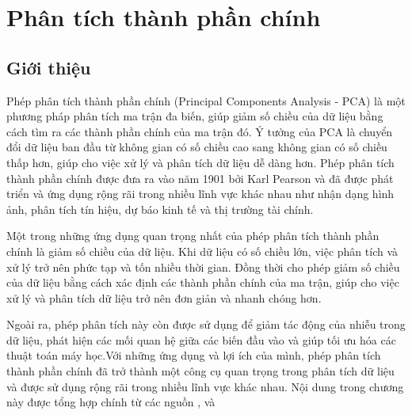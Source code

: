 \documentclass[12pt,a4paper,oneside]{report}
\numberwithin{equation}{section}
\begin{document}
\chapter{ Phân tích thành phần chính }
\section{Giới thiệu}
Phép phân tích thành phần chính (Principal Components Analysis - PCA) là một phương pháp phân tích ma trận đa biến, giúp giảm số chiều của dữ liệu bằng cách tìm ra các thành phần chính của ma trận đó. Ý tưởng của PCA là chuyển đổi dữ liệu ban đầu từ không gian có số chiều cao sang không gian có số chiều thấp hơn, giúp cho việc xử lý và phân tích dữ liệu dễ dàng hơn.
Phép phân tích thành phần chính được đưa ra vào năm 1901 bởi Karl Pearson và đã được phát triển và ứng dụng rộng rãi trong nhiều lĩnh vực khác nhau như nhận dạng hình ảnh, phân tích tín hiệu, dự báo kinh tế và thị trường tài chính.

Một trong những ứng dụng quan trọng nhất của phép phân tích thành phần chính là giảm số chiều của dữ liệu. Khi dữ liệu có số chiều lớn, việc phân tích và xử lý trở nên phức tạp và tốn nhiều thời gian. Đồng thời cho phép giảm số chiều của dữ liệu bằng cách xác định các thành phần chính của ma trận, giúp cho việc xử lý và phân tích dữ liệu trở nên đơn giản và nhanh chóng hơn.

Ngoài ra, phép phân tích này còn được sử dụng để giảm tác động của nhiễu trong dữ liệu, phát hiện các mối quan hệ giữa các biến đầu vào và giúp tối ưu hóa các thuật toán máy học.Với những ứng dụng và lợi ích của mình, phép phân tích thành phần chính đã trở thành một công cụ quan trọng trong phân tích dữ liệu và được sử dụng rộng rãi trong nhiều lĩnh vực khác nhau.
Nội dung trong chương này được tổng hợp chính từ các nguồn \cite{my2020}, \cite{tiep2018} và \cite{hyvarinen2009}
\end{document}
